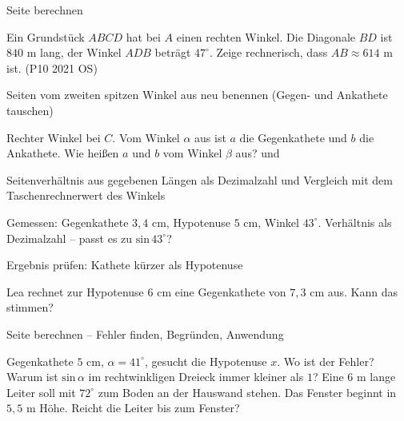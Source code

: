 \begin{aufgabe}{Seite berechnen}
\begin{teile}
\leerfeld[m]
\teil Ein Grundstück $ABCD$ hat bei $A$ einen rechten Winkel. Die Diagonale $BD$ ist $840$ m lang, der Winkel $ADB$ beträgt $47^\circ$. Zeige rechnerisch, dass $AB \approx 614$ m ist. \hfill (P10 2021 OS)
\end{teile}
\end{aufgabe}

\begin{aufgabe}{Seiten vom zweiten spitzen Winkel aus neu benennen (Gegen- und Ankathete tauschen)}
\begin{teile}
\teil Rechter Winkel bei $C$. Vom Winkel $\alpha$ aus ist $a$ die Gegenkathete und $b$ die Ankathete. Wie heißen $a$ und $b$ vom Winkel $\beta$ aus? \leerfeld und \leerfeld
\end{teile}
\end{aufgabe}

\begin{aufgabe}{Seitenverhältnis aus gegebenen Längen als Dezimalzahl und Vergleich mit dem Taschenrechnerwert des Winkels}
\begin{teile}
\teil Gemessen: Gegenkathete $3{,}4$ cm, Hypotenuse $5$ cm, Winkel $43^\circ$. Verhältnis als Dezimalzahl – passt es zu $\mathrm{sin}\,43^\circ$? \leerfeld
\end{teile}
\end{aufgabe}

\begin{aufgabe}{Ergebnis prüfen: Kathete kürzer als Hypotenuse}
\begin{teile}
\teil Lea rechnet zur Hypotenuse $6$ cm eine Gegenkathete von $7{,}3$ cm aus. Kann das stimmen?
\end{teile}
\end{aufgabe}

\begin{aufgabe}{Seite berechnen – Fehler finden, Begründen, Anwendung}
\begin{teile}
\teil Gegenkathete $5$ cm, $\alpha = 41^\circ$, gesucht die Hypotenuse $x$. Wo ist der Fehler? 
\teil Warum ist $\mathrm{sin}\,\alpha$ im rechtwinkligen Dreieck immer kleiner als $1$?
\teil Eine $6$ m lange Leiter soll mit $72^\circ$ zum Boden an der Hauswand stehen. Das Fenster beginnt in $5{,}5$ m Höhe. Reicht die Leiter bis zum Fenster?
\end{teile}
\end{aufgabe}

